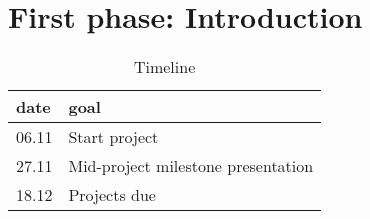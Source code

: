 \chapter*{First phase: Introduction}
\begin{table}
	\centering
	\begin{tabular}{ll}
		\toprule
		date& goal\\
		\midrule
		06.11& Start project\\
		27.11& Mid-project milestone presentation\\
		18.12& Projects due\\
		\bottomrule
	\end{tabular}
	\caption{Timeline}
	\label{tab:timeline}
\end{table}
